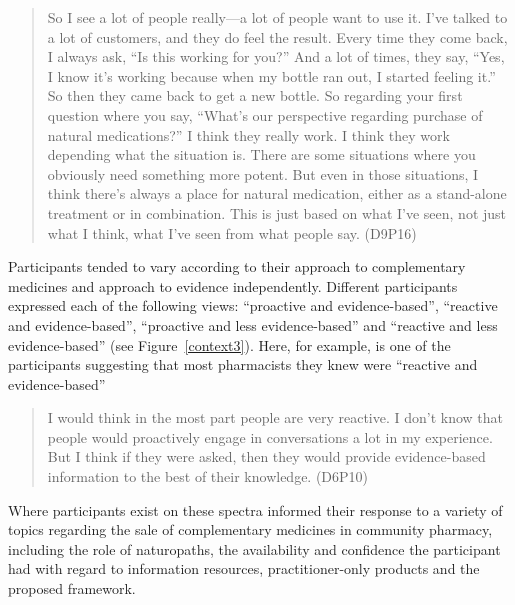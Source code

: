 \documentclass[12pt,]{article}
\begin{document}
\begin{quote}
So I see a lot of people really---a lot of people want to use it. I've
talked to a lot of customers, and they do feel the result. Every time
they come back, I always ask, ``Is this working for you?'' And a lot of
times, they say, ``Yes, I know it's working because when my bottle ran
out, I started feeling it.'' So then they came back to get a new bottle.
So regarding your first question where you say, ``What's our perspective
regarding purchase of natural medications?'' I think they really work. I
think they work depending what the situation is. There are some
situations where you obviously need something more potent. But even in
those situations, I think there's always a place for natural medication,
either as a stand-alone treatment or in combination. This is just based
on what I've seen, not just what I think, what I've seen from what
people say. (D9P16)
\end{quote}

Participants tended to vary according to their approach to complementary
medicines and approach to evidence independently. Different participants
expressed each of the following views: ``proactive and evidence-based'',
``reactive and evidence-based'', ``proactive and less evidence-based''
and ``reactive and less evidence-based'' (see Figure~\ref{context3}).
Here, for example, is one of the participants suggesting that most
pharmacists they knew were ``reactive and evidence-based''

\begin{quote}
I would think in the most part people are very reactive. I don't know
that people would proactively engage in conversations a lot in my
experience. But I think if they were asked, then they would provide
evidence-based information to the best of their knowledge. (D6P10)
\end{quote}

Where participants exist on these spectra informed their response to a
variety of topics regarding the sale of complementary medicines in
community pharmacy, including the role of naturopaths, the availability
and confidence the participant had with regard to information resources,
practitioner-only products and the proposed framework.
\end{document}
